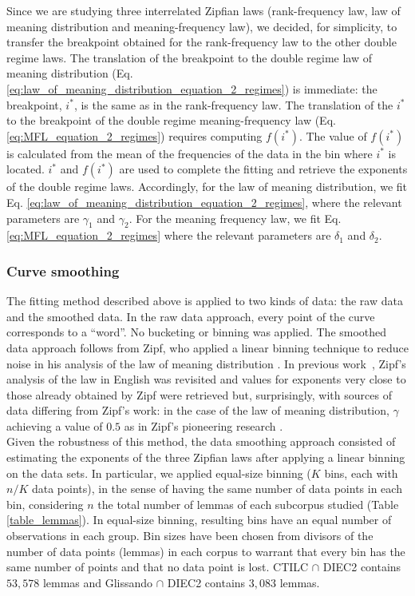 \documentclass[10pt,letterpaper]{article}
\begin{document}
Since we are studying three interrelated Zipfian laws (rank-frequency law, law of meaning distribution and meaning-frequency law), we decided, for simplicity, to transfer the breakpoint obtained for the rank-frequency law to the other double regime laws. The translation of the breakpoint to the double regime law of meaning distribution (Eq. \ref{eq:law_of_meaning_distribution_equation_2_regimes}) is immediate: the breakpoint, $i^*$, is the same as in the rank-frequency law. The translation of the $i^*$ to the breakpoint of the double regime meaning-frequency law (Eq. \ref{eq:MFL_equation_2_regimes}) requires computing $f(i^*)$. The value of $f(i^*)$ is calculated from the mean of the frequencies of the data in the bin where $i^*$ is located. $i^*$ and $f(i^*)$ are used to complete the fitting and retrieve the exponents of the double regime laws. Accordingly, for the law of meaning distribution, we fit Eq. \ref{eq:law_of_meaning_distribution_equation_2_regimes},
where the relevant parameters are $\gamma_1$ and $\gamma_2$. 
For the meaning frequency law, we fit Eq. \ref{eq:MFL_equation_2_regimes}
where the relevant parameters are $\delta_1$ and $\delta_2$.\\ 

\subsubsection*{Curve smoothing}

The fitting method described above is applied to two kinds of data: the raw data and the smoothed data. In the raw data approach, every point of the curve corresponds to a ``word''. No bucketing or binning was applied. The smoothed data approach follows from Zipf, who applied a linear binning technique to reduce noise in 
his analysis of the law of meaning distribution
\cite{Zipf1949, Zipf_MFL}. In previous work~\cite{Casas2019}, Zipf's analysis of the law in English \cite{Zipf1949} was revisited and values for exponents very close to those already obtained by Zipf were retrieved but, surprisingly, with sources of data differing from Zipf's work: in the case of the law of meaning distribution, $\gamma$ achieving a value of $0.5$ as in Zipf's pioneering research \cite{Zipf_MFL}.\\ 
Given the robustness of this method, the data smoothing approach consisted of estimating the exponents of the three Zipfian laws after applying a linear binning on the data sets. In particular, we applied equal-size binning ($K$ bins, each with $n/K$ data points), in the sense of having the same number of data points in each bin, considering $n$ the total number of lemmas of each subcorpus studied (Table \ref{table_lemmas}). In equal-size binning, resulting bins have an equal number of observations in each group. Bin sizes have been chosen from divisors of the number of data points (lemmas) in each corpus to warrant that every bin has the same number of points and that no data point is lost. CTILC $\cap$ DIEC2 contains $53,578$ lemmas and Glissando $\cap$ DIEC2 contains $3,083$ lemmas.
\end{document}

